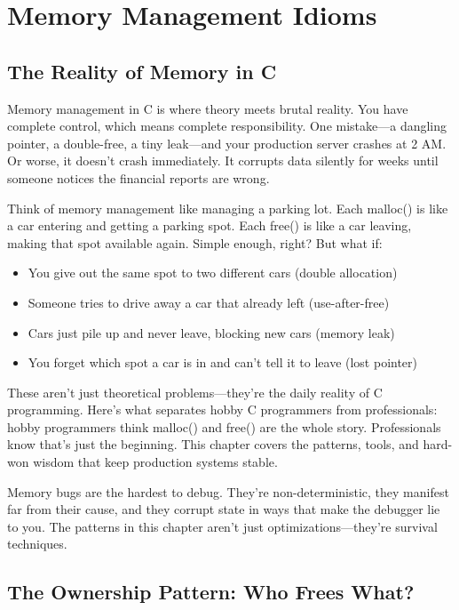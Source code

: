 \chapter{Memory Management Idioms}

\section{The Reality of Memory in C}

Memory management in C is where theory meets brutal reality. You have complete control, which means complete responsibility. One mistake---a dangling pointer, a double-free, a tiny leak---and your production server crashes at 2 AM. Or worse, it doesn't crash immediately. It corrupts data silently for weeks until someone notices the financial reports are wrong.

Think of memory management like managing a parking lot. Each malloc() is like a car entering and getting a parking spot. Each free() is like a car leaving, making that spot available again. Simple enough, right? But what if:
\begin{itemize}
    \item You give out the same spot to two different cars (double allocation)
    \item Someone tries to drive away a car that already left (use-after-free)
    \item Cars just pile up and never leave, blocking new cars (memory leak)
    \item You forget which spot a car is in and can't tell it to leave (lost pointer)
\end{itemize}

These aren't just theoretical problems---they're the daily reality of C programming. Here's what separates hobby C programmers from professionals: hobby programmers think malloc() and free() are the whole story. Professionals know that's just the beginning. This chapter covers the patterns, tools, and hard-won wisdom that keep production systems stable.

\begin{warningbox}
Memory bugs are the hardest to debug. They're non-deterministic, they manifest far from their cause, and they corrupt state in ways that make the debugger lie to you. The patterns in this chapter aren't just optimizations---they're survival techniques.
\end{warningbox}

\section{The Ownership Pattern: Who Frees What?}

